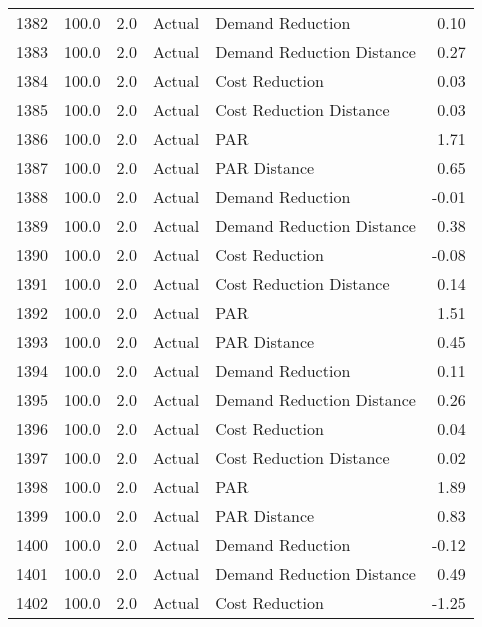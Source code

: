 \begin{longtable}{lrrllr}
1382 &        100.0 &     2.0 &         Actual &           Demand Reduction &   0.10 \\
1383 &        100.0 &     2.0 &         Actual &  Demand Reduction Distance &   0.27 \\
1384 &        100.0 &     2.0 &         Actual &             Cost Reduction &   0.03 \\
1385 &        100.0 &     2.0 &         Actual &    Cost Reduction Distance &   0.03 \\
1386 &        100.0 &     2.0 &         Actual &                        PAR &   1.71 \\
1387 &        100.0 &     2.0 &         Actual &               PAR Distance &   0.65 \\
1388 &        100.0 &     2.0 &         Actual &           Demand Reduction &  -0.01 \\
1389 &        100.0 &     2.0 &         Actual &  Demand Reduction Distance &   0.38 \\
1390 &        100.0 &     2.0 &         Actual &             Cost Reduction &  -0.08 \\
1391 &        100.0 &     2.0 &         Actual &    Cost Reduction Distance &   0.14 \\
1392 &        100.0 &     2.0 &         Actual &                        PAR &   1.51 \\
1393 &        100.0 &     2.0 &         Actual &               PAR Distance &   0.45 \\
1394 &        100.0 &     2.0 &         Actual &           Demand Reduction &   0.11 \\
1395 &        100.0 &     2.0 &         Actual &  Demand Reduction Distance &   0.26 \\
1396 &        100.0 &     2.0 &         Actual &             Cost Reduction &   0.04 \\
1397 &        100.0 &     2.0 &         Actual &    Cost Reduction Distance &   0.02 \\
1398 &        100.0 &     2.0 &         Actual &                        PAR &   1.89 \\
1399 &        100.0 &     2.0 &         Actual &               PAR Distance &   0.83 \\
1400 &        100.0 &     2.0 &         Actual &           Demand Reduction &  -0.12 \\
1401 &        100.0 &     2.0 &         Actual &  Demand Reduction Distance &   0.49 \\
1402 &        100.0 &     2.0 &         Actual &             Cost Reduction &  -1.25 \\

\end{longtable}
